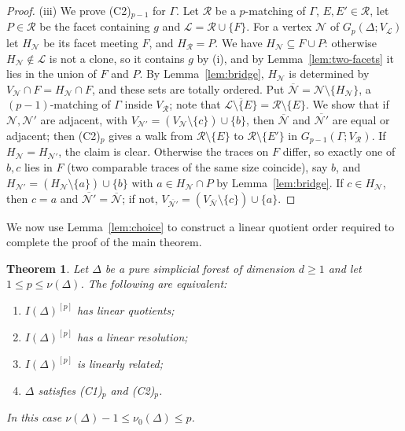 \documentclass{amsart}
\newtheorem{Theorem}{Theorem}[section]
\theoremstyle{definition}
\theoremstyle{remark}
\begin{document}
\begin{proof}
(iii) We prove (C2)$_{p-1}$ for $\Gamma$. Let $\mathcal R$ be a $p$-matching of $\Gamma$, $E,E'\in\mathcal R$, let $P\in\mathcal R$ be the facet containing $g$ and $\mathcal L=\mathcal R\cup\{F\}$. For a vertex $\mathcal N$ of $G_p(\Delta;V_{\mathcal L})$ let $H_{\mathcal N}$ be its facet meeting $F$, and $H_{\mathcal R}=P$. We have $H_{\mathcal N}\subseteq F\cup P$: otherwise $H_{\mathcal N}\notin\mathcal L$ is not a clone, so it contains $g$ by (i), and by Lemma~\ref{lem:two-facets} it lies in the union of $F$ and $P$. By Lemma~\ref{lem:bridge}, $H_{\mathcal N}$ is determined by $V_{\mathcal N}\cap F=H_{\mathcal N}\cap F$, and these sets are totally ordered. Put $\overline{\mathcal N}=\mathcal N\setminus\{H_{\mathcal N}\}$, a $(p-1)$-matching of $\Gamma$ inside $V_{\mathcal R}$; note that $\overline{\mathcal L\setminus\{E\}}=\mathcal R\setminus\{E\}$. We show that if $\mathcal N,\mathcal N'$ are adjacent, with $V_{\mathcal N'}=(V_{\mathcal N}\setminus\{c\})\cup\{b\}$, then $\overline{\mathcal N}$ and $\overline{\mathcal N'}$ are equal or adjacent; then (C2)$_p$ gives a walk from $\mathcal R\setminus\{E\}$ to $\mathcal R\setminus\{E'\}$ in $G_{p-1}(\Gamma;V_{\mathcal R})$. If $H_{\mathcal N}=H_{\mathcal N'}$, the claim is clear. Otherwise the traces on $F$ differ, so exactly one of $b,c$ lies in $F$ (two comparable traces of the same size coincide), say $b$, and $H_{\mathcal N'}=(H_{\mathcal N}\setminus\{a\})\cup\{b\}$ with $a\in H_{\mathcal N}\cap P$ by Lemma~\ref{lem:bridge}. If $c\in H_{\mathcal N}$, then $c=a$ and $\overline{\mathcal N'}=\overline{\mathcal N}$; if not, $V_{\overline{\mathcal N'}}=(V_{\overline{\mathcal N}}\setminus\{c\})\cup\{a\}$.
\end{proof}


We now use Lemma~\ref{lem:choice} to construct a linear quotient order required to complete the proof of the main theorem.

\begin{Theorem}\label{thm:main}
Let $\Delta$ be a pure simplicial forest of dimension $d\geq 1$ and let $1\leq p\leq\nu(\Delta)$. The following are equivalent:
\begin{enumerate}
\item[\textnormal{(a)}] $I(\Delta)^{[p]}$ has linear quotients;
\item[\textnormal{(b)}] $I(\Delta)^{[p]}$ has a linear resolution;
\item[\textnormal{(c)}] $I(\Delta)^{[p]}$ is linearly related;
\item[\textnormal{(d)}] $\Delta$ satisfies \textnormal{(C1)$_p$} and \textnormal{(C2)$_p$}.
\end{enumerate}
In this case $\nu(\Delta)-1\leq\nu_0(\Delta)\leq p$.
\end{Theorem}
\end{document}
